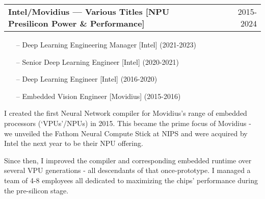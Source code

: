 \documentclass[a4paper,12pt]{article}
\makeatletter
\newenvironment{jobshort}[2]
    {
    \begin{tabularx}{\linewidth}{@{}l X r@{}}
    \textbf{#1} & \hfill &  #2 \\[3.75pt]
    \end{tabularx}
    }
    {
    }
\makeatother
\begin{document}
\begin{jobshort}{Intel/Movidius --- Various Titles [NPU Presilicon Power \& Performance]}{2015-2024}

\vspace{-15pt}
\begin{itemize}[noitemsep,topsep=0pt,parsep=0pt,partopsep=0pt]
    \item[--] Deep Learning Engineering Manager [Intel] (2021-2023)
    \item[--] Senior Deep Learning Engineer [Intel] (2020-2021)
    \item[--] Deep Learning Engineer [Intel] (2016-2020)
    \item[--] Embedded Vision Engineer [Movidius] (2015-2016)
\end{itemize}

I created the first Neural Network compiler for Movidius's range of embedded processors (‘VPUs’/NPUs) in 2015. This became the prime focus of Movidius - we unveiled the Fathom Neural Compute Stick at NIPS and were acquired by Intel the next year to be their NPU offering.

Since then, I improved the compiler and corresponding embedded runtime over several VPU generations - all descendants of that once-prototype. I managed a team of 4-8 employees all dedicated to maximizing the chips' performance during the pre-silicon stage.


\end{jobshort}
\end{document}
